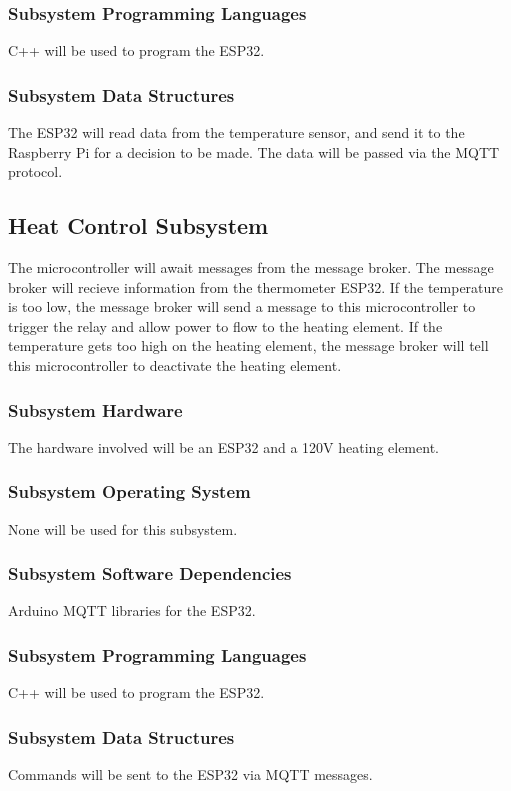 \subsubsection{Subsystem Programming Languages}
C++ will be used to program the ESP32.

\subsubsection{Subsystem Data Structures}
The ESP32 will read data from the temperature sensor, and send it to the
Raspberry Pi for a decision to be made. The data will be passed via the MQTT protocol.

\subsection{Heat Control Subsystem}
The microcontroller will await messages from the message broker. The message
broker will recieve information from the thermometer ESP32. If the temperature
is too low, the message broker will send a message to this microcontroller to
trigger the relay and allow power to flow to the heating element. If the
temperature gets too high on the heating element, the message broker will tell
this microcontroller to deactivate the heating element.

\subsubsection{Subsystem Hardware}
The hardware involved will be an ESP32 and a 120V heating element. 

\subsubsection{Subsystem Operating System}
None will be used for this subsystem.

\subsubsection{Subsystem Software Dependencies}
Arduino MQTT libraries for the ESP32.

\subsubsection{Subsystem Programming Languages}
C++ will be used to program the ESP32.

\subsubsection{Subsystem Data Structures}
Commands will be sent to the ESP32 via MQTT messages. 

